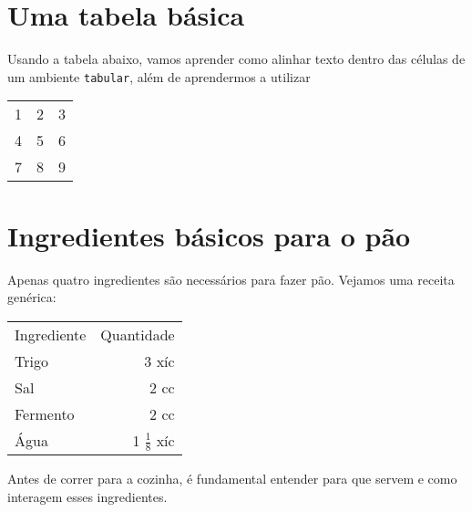 \documentclass[a4paper,oneside]{article}
\begin{document}
\frenchspacing

\section{Uma tabela básica}

Usando a tabela abaixo, vamos aprender como alinhar texto dentro das células de
um ambiente \texttt{tabular}, além de aprendermos a utilizar 

\begin{center}
  \begin{tabular}{l c r}
    1 & 2 & 3\\
    4 & 5 & 6\\
    7 & 8 & 9\\
  \end{tabular}
\end{center}

\section{Ingredientes básicos para o pão}

Apenas quatro ingredientes são necessários para fazer pão. Vejamos uma receita
genérica:

\begin{center}
  \begin{tabular}{lr}
    Ingrediente & Quantidade\\[5pt]
    Trigo & 3 xíc\\
    Sal & 2 cc\\
    Fermento & 2 cc\\
    Água & 1 $\frac{1}{8}$ xíc
  \end{tabular}  
\end{center}

Antes de correr para a cozinha, é fundamental entender para que servem e como
interagem esses ingredientes.
\end{document}
